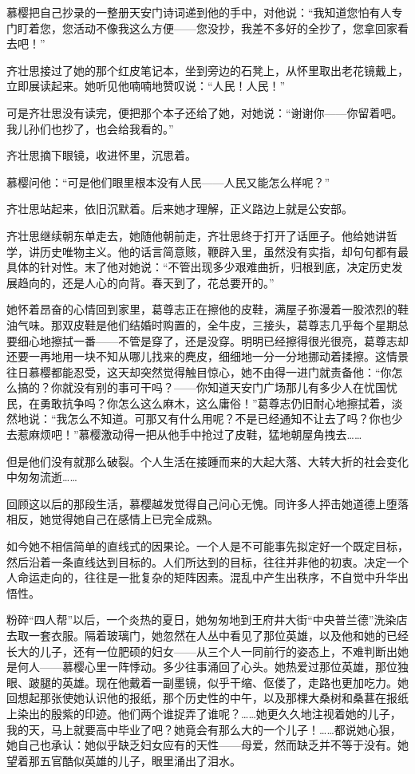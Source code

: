 \par 慕樱把自己抄录的一整册天安门诗词递到他的手中，对他说：“我知道您怕有人专门盯着您，您活动不像我这么方便——您没抄，我差不多好的全抄了，您拿回家看去吧！”
\par 齐壮思接过了她的那个红皮笔记本，坐到旁边的石凳上，从怀里取出老花镜戴上，立即展读起来。她听见他喃喃地赞叹说：“人民！人民！”
\par 可是齐壮思没有读完，便把那个本子还给了她，对她说：“谢谢你——你留着吧。我儿孙们也抄了，也会给我看的。”
\par 齐壮思摘下眼镜，收进怀里，沉思着。
\par 慕樱问他：“可是他们眼里根本没有人民——人民又能怎么样呢？”
\par 齐壮思站起来，依旧沉默着。后来她才理解，正义路边上就是公安部。
\par 齐壮思继续朝东单走去，她随他朝前走，齐壮思终于打开了话匣子。他给她讲哲学，讲历史唯物主义。他的话言简意赅，鞭辟入里，虽然没有实指，却句句都有最具体的针对性。末了他对她说：“不管出现多少艰难曲折，归根到底，决定历史发展趋向的，还是人心的向背。春天到了，花总要开的。”
\par 她怀着昂奋的心情回到家里，葛尊志正在擦他的皮鞋，满屋子弥漫着一股浓烈的鞋油气味。那双皮鞋是他们结婚时购置的，全牛皮，三接头，葛尊志几乎每个星期总要细心地擦拭一番——不管是穿了，还是没穿。明明已经擦得很光很亮，葛尊志却还要一再地用一块不知从哪儿找来的麂皮，细细地一分一分地挪动着揉擦。这情景往日慕樱都能忍受，这天却突然觉得触目惊心，她不由得一进门就责备他：“你怎么搞的？你就没有别的事可干吗？——你知道天安门广场那儿有多少人在忧国忧民，在勇敢抗争吗？你怎么这么麻木，这么庸俗！”葛尊志仍旧耐心地擦拭着，淡然地说：“我怎么不知道。可那又有什么用呢？不是已经通知不让去了吗？你也少去惹麻烦吧！”慕樱激动得一把从他手中抢过了皮鞋，猛地朝屋角拽去……
\par 但是他们没有就那么破裂。个人生活在接踵而来的大起大落、大转大折的社会变化中匆匆流逝……
\par 回顾这以后的那段生活，慕樱越发觉得自己问心无愧。同许多人抨击她道德上堕落相反，她觉得她自己在感情上已完全成熟。
\par 如今她不相信简单的直线式的因果论。一个人是不可能事先拟定好一个既定目标，然后沿着一条直线达到目标的。人们所达到的目标，往往并非他的初衷。决定一个人命运走向的，往往是一批复杂的矩阵因素。混乱中产生出秩序，不自觉中升华出悟性。
\par 粉碎“四人帮”以后，一个炎热的夏日，她匆匆地到王府井大街“中央普兰德”洗染店去取一套衣服。隔着玻璃门，她忽然在人丛中看见了那位英雄，以及他和她的已经长大的儿子，还有一位肥硕的妇女——从三个人一同前行的姿态上，不难判断出她是何人——慕樱心里一阵悸动。多少往事涌回了心头。她热爱过那位英雄，那位独眼、跛腿的英雄。现在他戴着一副墨镜，似乎干缩、伛偻了，走路也更加吃力。她回想起那张使她认识他的报纸，那个历史性的中午，以及那棵大桑树和桑葚在报纸上染出的殷紫的印迹。他们两个谁捉弄了谁呢？……她更久久地注视着她的儿子，我的天，马上就要高中毕业了吧？她竟会有那么大的一个儿子！……都说她心狠，她自己也承认：她似乎缺乏妇女应有的天性——母爱，然而缺乏并不等于没有。她望着那五官酷似英雄的儿子，眼里涌出了泪水。
